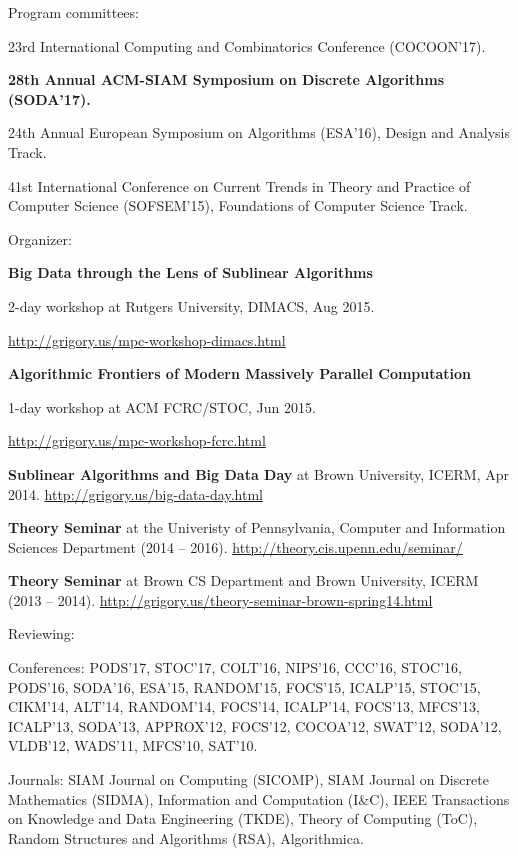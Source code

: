 \documentclass[11pt]{article}
\newenvironment{innerlist}[1][\enskip\textbullet]%
        {\begin{compactitem}[#1]}{\end{compactitem}}
\newcommand{\blankline}{\quad\pagebreak[2]}
\begin{document}
Program committees:
\begin{innerlist}
	\item 23rd International Computing and Combinatorics Conference (COCOON'17).
	\item \textbf{28th Annual ACM-SIAM Symposium on Discrete Algorithms (SODA'17).}
	\item 24th Annual European Symposium on Algorithms (ESA'16), Design and Analysis Track. 
	\item 41st International Conference on Current Trends in Theory and Practice of Computer Science (SOFSEM'15), Foundations of Computer Science Track.
\end{innerlist}

\blankline

Organizer:
\begin{innerlist}
	\item \textbf{Big Data through the Lens of Sublinear Algorithms} 
	
	2-day workshop at Rutgers University, DIMACS, Aug 2015. 
	
	\url{http://grigory.us/mpc-workshop-dimacs.html}
	\item \textbf{Algorithmic Frontiers of Modern Massively Parallel Computation}
	
	 1-day workshop at ACM FCRC/STOC, Jun 2015. 
	 
	 \url{http://grigory.us/mpc-workshop-fcrc.html}
	\item \textbf{Sublinear Algorithms and Big Data Day} at Brown University, ICERM, Apr 2014. \url{http://grigory.us/big-data-day.html}
	\item \textbf{Theory Seminar} at the Univeristy of Pennsylvania, Computer and Information Sciences Department (2014 -- 2016). \url{http://theory.cis.upenn.edu/seminar/}
	\item \textbf{Theory Seminar} at Brown CS Department and Brown University, ICERM (2013 -- 2014). \url{http://grigory.us/theory-seminar-brown-spring14.html}
\end{innerlist}
\blankline

Reviewing:

\begin{innerlist}
	\item Conferences: PODS'17, STOC'17, COLT'16, NIPS'16, CCC'16, STOC'16, PODS'16, SODA'16, ESA'15, RANDOM'15, FOCS'15, ICALP'15, STOC'15, CIKM'14, ALT'14, RANDOM'14, FOCS'14, ICALP'14, FOCS'13, MFCS'13, ICALP'13, SODA'13, APPROX'12, FOCS'12, COCOA'12, SWAT'12, SODA'12, VLDB'12, WADS'11, MFCS'10, SAT'10.
	\item Journals: SIAM Journal on Computing (SICOMP), SIAM Journal on Discrete Mathematics (SIDMA), Information and Computation (I\&C), IEEE Transactions on Knowledge and Data Engineering (TKDE), Theory of Computing (ToC), Random Structures and Algorithms (RSA), Algorithmica.
\end{innerlist}
\end{document}
